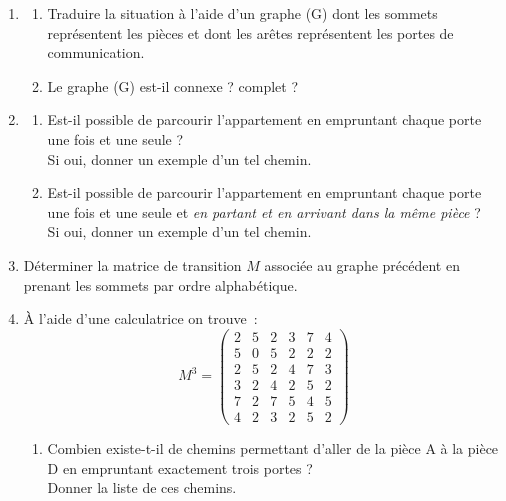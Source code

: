 \begin{enumerate}
     \item %

     \begin{enumerate}[label=\alph*.]
          \item %
          Traduire la situation à l'aide d'un graphe (G) dont les sommets représentent les pièces et dont les arêtes représentent les portes de communication.
          \item %
          Le graphe (G) est-il connexe ? complet ?
     \end{enumerate}
    
     \item %
     \begin{enumerate}[label=\alph*.]
          \item %
          Est-il possible de parcourir l'appartement en empruntant chaque porte une fois et une seule ?\\
          Si oui, donner un exemple d'un tel chemin.
          \item %
          Est-il possible de parcourir l'appartement en empruntant chaque porte une fois et une seule et \textit{en partant et en arrivant dans la même pièce} ?\\
          Si oui, donner un exemple d'un tel chemin.
     \end{enumerate}
    
     \item %
     Déterminer la matrice de transition $M$ associée au graphe précédent en prenant les sommets par ordre alphabétique.
   
     \item %
    
     \`A l'aide d'une calculatrice on trouve~:
     \[ M^3 = \begin{pmatrix}
          2 &5 &2 &3 &7 &4 \\
          5 &0 &5 &2 &2 &2 \\
          2 &5 &2 &4 &7 &3 \\
          3 &2 &4 &2 &5 &2 \\
          7 &2 &7 &5 &4 &5\\
     4 &2 &3 &2 &5 &2  \end{pmatrix} \]
     \begin{enumerate}[label=\alph*.]
          \item %

          Combien existe-t-il de chemins permettant d'aller de la pièce A à la pièce D en empruntant exactement trois portes ?\\
          Donner la liste de ces chemins.


\end{enumerate}
\end{enumerate}
